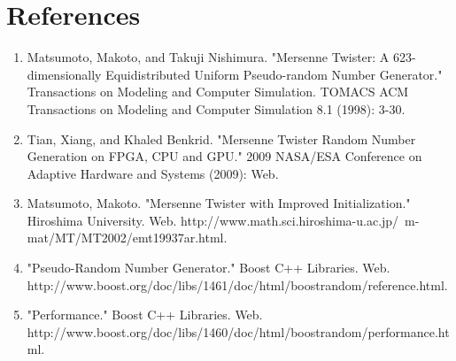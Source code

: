 \documentclass[12pt,a4paper]{article}
\begin{document}
\section*{References}
\begin{enumerate}
  \item   Matsumoto, Makoto, and Takuji Nishimura. "Mersenne Twister: A 623-dimensionally Equidistributed Uniform Pseudo-random Number Generator." Transactions on Modeling and Computer Simulation. TOMACS ACM Transactions on Modeling and Computer Simulation 8.1 (1998): 3-30.
  \item Tian, Xiang, and Khaled Benkrid. "Mersenne Twister Random Number Generation on FPGA, CPU and GPU." 2009 NASA/ESA Conference on Adaptive Hardware and Systems (2009): Web.
  \item Matsumoto, Makoto. "Mersenne Twister with Improved Initialization." Hiroshima University. Web. http://www.math.sci.hiroshima-u.ac.jp/~m-mat/MT/MT2002/emt19937ar.html.
  \item "Pseudo-Random Number Generator." Boost C++ Libraries. Web. \\ http://www.boost.org/doc/libs/1461/doc/html/boostrandom/reference.html.
  \item "Performance." Boost C++ Libraries. Web. \\ http://www.boost.org/doc/libs/1460/doc/html/boostrandom/performance.html. 
  
\end{enumerate}
\end{document}

